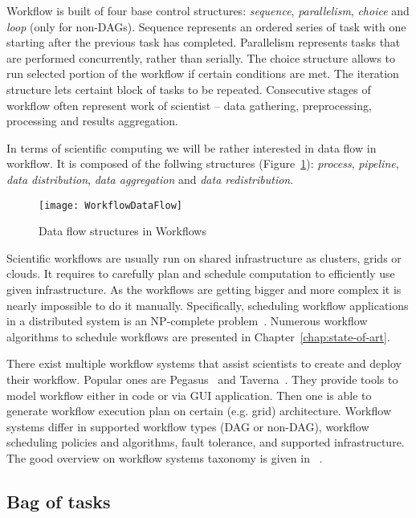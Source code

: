 Workflow is built of four base control structures: \emph{sequence}, \emph{parallelism}, \emph{choice} and \emph{loop} (only for non-DAGs). Sequence represents an ordered series of task with one starting after the previous task has completed. Parallelism represents tasks that are performed concurrently, rather than serially. The choice structure allows to run selected portion of the workflow if certain conditions are met. The iteration structure lets certaint block of tasks to be repeated. Consecutive stages of workflow often represent work of scientist – data gathering, preprocessing, processing and results aggregation. 

In terms of scientific computing we will be rather interested in data flow in workflow. It is composed of the follwing structures (Figure~\ref{fig:intro:workflow:structures}): \emph{process}, \emph{pipeline}, \emph{data distribution}, \emph{data aggregation} and \emph{data redistribution}.

\begin{figure}[tb]
   \centering
   \texttt{[image: WorkflowDataFlow]}  
   \caption{Data flow structures in Workflows~\cite{Bharathi08}}
   \label{fig:intro:workflow:structures}
\end{figure} 


Scientific workflows are usually run on shared infrastructure as clusters, grids or clouds. It requires to carefully plan and schedule computation to efficiently use given infrastructure. As the workflows are getting bigger and more complex it is nearly impossible to do it manually. Specifically, scheduling workflow applications in a distributed system is an NP-complete problem~\cite{Garey:1979:CIG:578533}. Numerous workflow algorithms to schedule workflows are presented in Chapter \ref{chap:state-of-art}.

There exist multiple workflow systems that assist scientists to create and deploy their workflow. Popular ones are Pegasus~\cite{Pegasus} and Taverna~\cite{Taverna}. They provide tools to model workflow either in code or via GUI application. Then one is able to generate workflow execution plan on certain (e.g. grid) architecture. Workflow systems differ in supported workflow types (DAG or non-DAG), workflow scheduling policies and algorithms, fault tolerance, and supported infrastructure. The good overview on workflow systems taxonomy is given in ~\cite{Yu:2005:TSW:1084805.1084814}.

\subsection{Bag of tasks}

